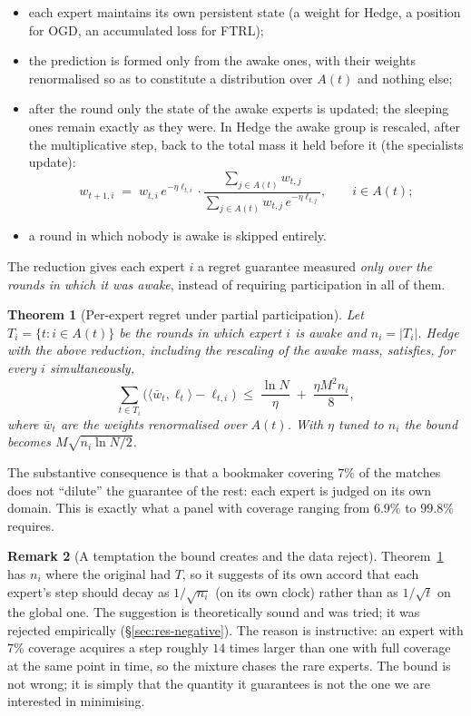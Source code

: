 \documentclass[12pt,a4paper,oneside]{report}
\renewcommand{\_}{\oldunderscore\allowbreak}
\theoremstyle{definition}
\theoremstyle{plain}
\newtheorem{theorem}{Theorem}[chapter]
\theoremstyle{definition}   %
\newtheorem{remark}[theorem]{Remark}
\begin{document}
\begin{itemize}
  \item each expert maintains its own persistent state (a weight for Hedge, a position for OGD,
        an accumulated loss for FTRL);
  \item the prediction is formed only from the awake ones, with their weights renormalised so
        as to constitute a distribution over $A(t)$ and nothing else;
  \item after the round only the state of the awake experts is updated; the sleeping ones
        remain exactly as they were. In Hedge the awake group is rescaled, after the
        multiplicative step, back to the total mass it held before it (the specialists update):
        \[
        w_{t+1,i} \;=\; w_{t,i}\, e^{-\eta \ell_{t,i}} \cdot
        \frac{\sum_{j\in A(t)} w_{t,j}}{\sum_{j\in A(t)} w_{t,j}\, e^{-\eta \ell_{t,j}}},
        \qquad i\in A(t);
        \]
  \item a round in which nobody is awake is skipped entirely.
\end{itemize}

The reduction gives each expert $i$ a regret guarantee measured \emph{only over the rounds in
which it was awake}, instead of requiring participation in all of them.

\begin{theorem}[Per-expert regret under partial participation]
\label{thm:sleeping}
Let $T_i = \{t : i \in A(t)\}$ be the rounds in which expert $i$ is awake and $n_i = |T_i|$.
Hedge with the above reduction, including the rescaling of the awake mass, satisfies, for
every $i$ simultaneously,
\[
\sum_{t \in T_i} \Big( \langle \bar{w}_t, \ell_t\rangle - \ell_{t,i} \Big)
\;\leq\; \frac{\ln N}{\eta} \;+\; \frac{\eta M^2 n_i}{8},
\]
where $\bar{w}_t$ are the weights renormalised over $A(t)$. With $\eta$ tuned to $n_i$ the
bound becomes $M\sqrt{n_i \ln N/2}$.
\end{theorem}

The substantive consequence is that a bookmaker covering $7\%$ of the matches does not
``dilute'' the guarantee of the rest: each expert is judged on its own domain. This is exactly
what a panel with coverage ranging from $6.9\%$ to $99.8\%$ requires.

\begin{remark}[A temptation the bound creates and the data reject]
Theorem~\ref{thm:sleeping} has $n_i$ where the original had $T$, so it suggests of its own
accord that each expert's step should decay as $1/\sqrt{n_i}$ (on its own clock) rather than as
$1/\sqrt{t}$ on the global one. The suggestion is theoretically sound and was tried; it was
rejected empirically (\S\ref{sec:res-negative}). The reason is instructive: an expert with
$7\%$ coverage acquires a step roughly $14$ times larger than one with full coverage at the
same point in time, so the mixture chases the rare experts. The bound is not wrong; it is
simply that the quantity it guarantees is not the one we are interested in minimising.
\end{remark}
\end{document}
